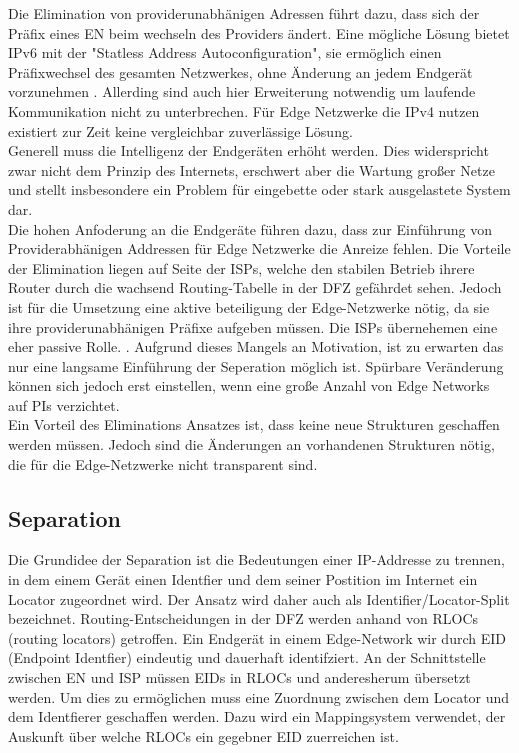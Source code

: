 Die Elimination von providerunabhänigen Adressen führt dazu, dass sich der Präfix eines EN beim wechseln des Providers ändert. Eine mögliche Lösung bietet IPv6 mit der "Statless Address Autoconfiguration", sie ermöglich einen Präfixwechsel des gesamten Netzwerkes, ohne Änderung an jedem Endgerät vorzunehmen \cite{RFC4862}. Allerding sind auch hier Erweiterung notwendig um laufende Kommunikation nicht zu unterbrechen. Für Edge Netzwerke die IPv4 nutzen existiert zur Zeit keine vergleichbar zuverlässige Lösung.\\

Generell muss die Intelligenz der Endgeräten erhöht werden. Dies widerspricht zwar nicht dem Prinzip des Internets, erschwert aber die Wartung großer Netze und stellt insbesondere ein Problem für eingebette oder stark ausgelastete System dar. \\

Die hohen Anfoderung an die Endgeräte führen dazu, dass zur Einführung von Providerabhänigen Addressen für Edge Netzwerke die Anreize fehlen. Die Vorteile der Elimination liegen auf Seite der ISPs, welche den stabilen Betrieb ihrere Router durch die wachsend Routing-Tabelle in der DFZ  gefährdet sehen. Jedoch ist für die Umsetzung eine aktive beteiligung der Edge-Netzwerke nötig, da sie ihre providerunabhänigen Präfixe aufgeben müssen. Die ISPs übernehemen eine eher passive Rolle. \cite{jen:2008:start}. Aufgrund dieses Mangels an Motivation, ist zu erwarten das nur eine langsame Einführung der Seperation möglich ist. Spürbare Veränderung können sich jedoch erst einstellen, wenn eine große Anzahl von Edge Networks auf PIs verzichtet. \\

Ein Vorteil des Eliminations Ansatzes ist, dass keine neue Strukturen geschaffen werden müssen. Jedoch sind die Änderungen an vorhandenen Strukturen nötig, die für die Edge-Netzwerke nicht transparent sind.

\subsection{Separation}
Die Grundidee der Separation ist die Bedeutungen einer IP-Addresse zu trennen, in dem einem Gerät einen Identfier und dem seiner Postition im Internet ein Locator zugeordnet wird. Der Ansatz wird daher auch als Identifier/Locator-Split bezeichnet. Routing-Entscheidungen in der DFZ werden anhand von RLOCs (routing locators) getroffen. Ein Endgerät in einem Edge-Network wir durch EID (Endpoint Identfier) eindeutig und dauerhaft identifziert. An der Schnittstelle zwischen EN und ISP müssen EIDs in RLOCs und anderesherum übersetzt werden. Um dies zu ermöglichen muss eine Zuordnung zwischen dem Locator und dem Identfierer geschaffen werden. Dazu wird ein Mappingsystem verwendet, der Auskunft über welche RLOCs ein gegebner EID zuerreichen ist. 

